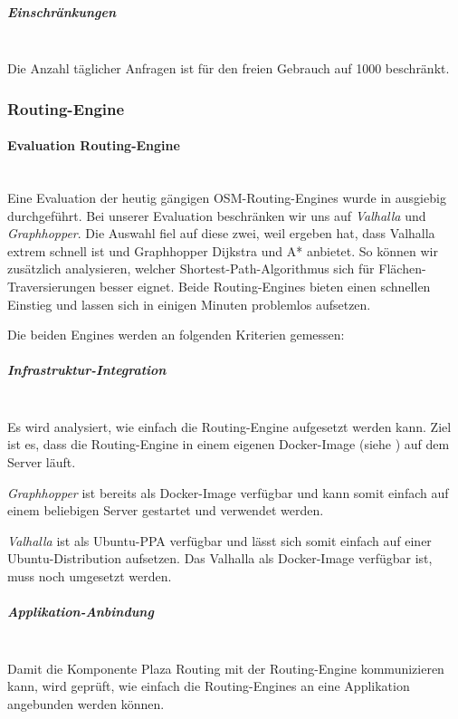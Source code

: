 \subparagraph{Einschränkungen}\label{architektur:search.ch Einschränkungen}~\\
Die Anzahl täglicher Anfragen ist für den freien Gebrauch auf 1000 beschränkt.

\subsubsection{Routing-Engine}
\label{architektur:Routing-Engine}

\paragraph{Evaluation Routing-Engine}~\\
\label{architektur:Evaluation Routing-Engine}
Eine Evaluation der heutig gängigen \ac{OSM}-Routing-Engines wurde in \cite{eval_routing_engine} ausgiebig durchgeführt. Bei unserer Evaluation beschränken wir uns auf \emph{Valhalla}\cite{valhalla} und \emph{Graphhopper}\cite{graphhopper}. Die Auswahl fiel auf diese zwei, weil \cite{eval_routing_engine} ergeben hat, dass Valhalla extrem schnell ist und Graphhopper Dijkstra und A* anbietet. So können wir zusätzlich analysieren, welcher Shortest-Path-Algorithmus sich für Flächen-Traversierungen besser eignet. Beide Routing-Engines bieten einen schnellen Einstieg und lassen sich in einigen Minuten problemlos aufsetzen.

Die beiden Engines werden an folgenden Kriterien gemessen:

\subparagraph{Infrastruktur-Integration}~\\
\label{architektur:Infrastruktur-Integration}
Es wird analysiert, wie einfach die Routing-Engine aufgesetzt werden kann. Ziel ist es, dass die Routing-Engine in einem eigenen Docker-Image (siehe ) auf dem Server läuft.

\emph{Graphhopper} ist bereits als Docker-Image verfügbar und kann somit einfach auf einem beliebigen Server gestartet und verwendet werden.

\emph{Valhalla} ist als Ubuntu-\ac{PPA} verfügbar und lässt sich somit einfach auf einer Ubuntu-Distribution aufsetzen. Das Valhalla als Docker-Image verfügbar ist, muss noch umgesetzt werden.

\subparagraph{Applikation-Anbindung}~\\
\label{architektur:Applikation-Anbindung}
Damit die Komponente Plaza Routing mit der Routing-Engine kommunizieren kann, wird geprüft, wie einfach die Routing-Engines an eine Applikation angebunden werden können. 

